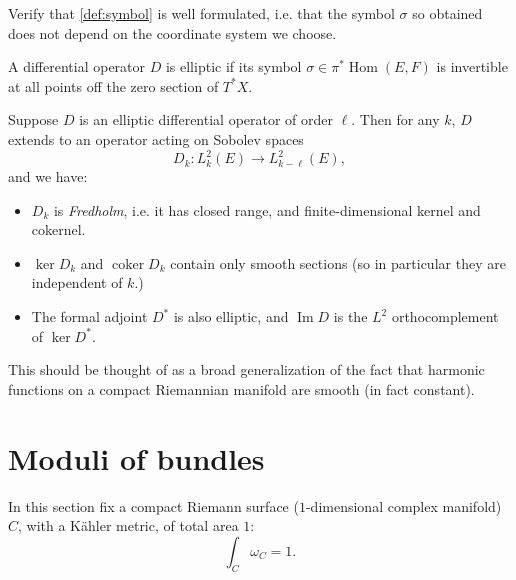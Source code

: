 \documentclass[12pt,letterpaper,reqno]{article}
\numberwithin{equation}{section}
\newcommand{\R}{\ensuremath{\mathbb R}}
\newcommand{\kahler}{K\"ahler\xspace}
\newcommand{\ti}[1]{\textit{#1}}
\DeclareMathOperator{\im}{Im}
\DeclareMathOperator{\Hom}{Hom}
\DeclareMathOperator{\coker}{coker}
\begin{document}
\begin{exercise} Verify that \autoref{def:symbol}
is well formulated, i.e. that the symbol $\sigma$ so obtained
does not depend on the coordinate system we choose.
\end{exercise}

\begin{defn} 
A differential operator $D$ is elliptic if its
symbol $\sigma \in \pi^* \Hom(E,F)$ is invertible
at all points off the zero section of $T^* X$.
\end{defn}

\begin{thm} \label{thm:elliptic-regularity}
Suppose $D$ is an elliptic differential operator of order $\ell$. 
Then for any $k$,
$D$ extends to an operator acting on Sobolev spaces
$$D_k: L^2_k(E) \to L^2_{k-\ell}(E),$$
and we have:
\begin{itemize}
\item $D_k$ is \ti{Fredholm}, i.e. it has closed range, 
and finite-dimensional 
kernel and cokernel.
\item $\ker D_k$ and $\coker D_k$ contain only
smooth sections (so in particular they are independent of $k$.)
\item The formal adjoint $D^*$ is also elliptic, and
$\im D$ is the $L^2$ orthocomplement of $\ker D^*$.
\end{itemize}
\end{thm}

This should be thought of as a broad generalization of the
fact that harmonic functions on a compact Riemannian manifold 
are smooth (in fact constant).



\section{Moduli of bundles}

In this section fix a compact Riemann surface ($1$-dimensional
complex manifold) $C$, with a \kahler metric, of total area $1$:
\begin{equation}
  \int_C \omega_C = 1.
\end{equation}
\end{document}
